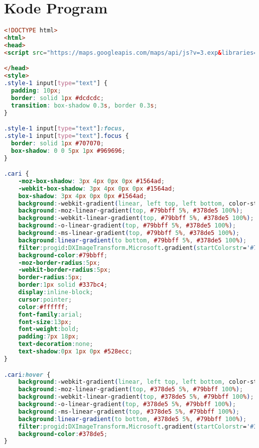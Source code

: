 \chapter{Kode Program}
\label{kode_program}

\singlespacing 
%
%
\begin{lstlisting}[language=HTML,basicstyle=\tiny,caption=aplikasi.html]
<!DOCTYPE html>
<html>
<head>
<script src="https://maps.googleapis.com/maps/api/js?v=3.exp&libraries=geometry"></script>

</head>
<style>
.style-1 input[type="text"] {
  padding: 10px;
  border: solid 1px #dcdcdc;
  transition: box-shadow 0.3s, border 0.3s;
}

.style-1 input[type="text"]:focus,
.style-1 input[type="text"].focus {
  border: solid 1px #707070;
  box-shadow: 0 0 5px 1px #969696;
}

.cari {
	-moz-box-shadow: 3px 4px 0px 0px #1564ad;
	-webkit-box-shadow: 3px 4px 0px 0px #1564ad;
	box-shadow: 3px 4px 0px 0px #1564ad;
	background:-webkit-gradient(linear, left top, left bottom, color-stop(0.05, #79bbff), color-stop(1, #378de5));
	background:-moz-linear-gradient(top, #79bbff 5%, #378de5 100%);
	background:-webkit-linear-gradient(top, #79bbff 5%, #378de5 100%);
	background:-o-linear-gradient(top, #79bbff 5%, #378de5 100%);
	background:-ms-linear-gradient(top, #79bbff 5%, #378de5 100%);
	background:linear-gradient(to bottom, #79bbff 5%, #378de5 100%);
	filter:progid:DXImageTransform.Microsoft.gradient(startColorstr='#79bbff', endColorstr='#378de5',GradientType=0);
	background-color:#79bbff;
	-moz-border-radius:5px;
	-webkit-border-radius:5px;
	border-radius:5px;
	border:1px solid #337bc4;
	display:inline-block;
	cursor:pointer;
	color:#ffffff;
	font-family:arial;
	font-size:13px;
	font-weight:bold;
	padding:7px 18px;
	text-decoration:none;
	text-shadow:0px 1px 0px #528ecc;
}

.cari:hover {
	background:-webkit-gradient(linear, left top, left bottom, color-stop(0.05, #378de5), color-stop(1, #79bbff));
	background:-moz-linear-gradient(top, #378de5 5%, #79bbff 100%);
	background:-webkit-linear-gradient(top, #378de5 5%, #79bbff 100%);
	background:-o-linear-gradient(top, #378de5 5%, #79bbff 100%);
	background:-ms-linear-gradient(top, #378de5 5%, #79bbff 100%);
	background:linear-gradient(to bottom, #378de5 5%, #79bbff 100%);
	filter:progid:DXImageTransform.Microsoft.gradient(startColorstr='#378de5', endColorstr='#79bbff',GradientType=0);
	background-color:#378de5;
}


\end{lstlisting}
